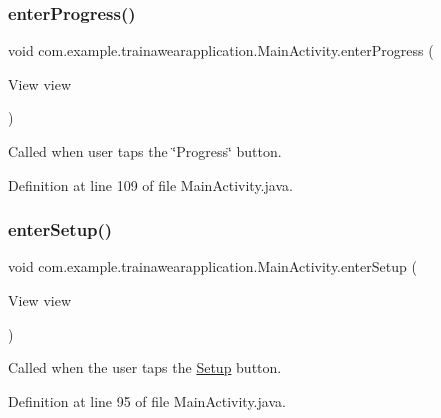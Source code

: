 \subsubsection{\texorpdfstring{enterProgress()}{enterProgress()}}
{\footnotesize\ttfamily void com.\+example.\+trainawearapplication.\+Main\+Activity.\+enter\+Progress (\begin{DoxyParamCaption}\item[{View}]{view }\end{DoxyParamCaption})}



Called when user taps the \char`\"{}\+Progress\char`\"{} button. 



Definition at line 109 of file Main\+Activity.\+java.


\begin{DoxyCode}{0}

\end{DoxyCode}
\mbox{\label{classcom_1_1example_1_1trainawearapplication_1_1_main_activity_aeb1226f930e5d26a0aa04fc7614f3618}} 
\subsubsection{\texorpdfstring{enterSetup()}{enterSetup()}}
{\footnotesize\ttfamily void com.\+example.\+trainawearapplication.\+Main\+Activity.\+enter\+Setup (\begin{DoxyParamCaption}\item[{View}]{view }\end{DoxyParamCaption})}



Called when the user taps the \mbox{\hyperlink{classcom_1_1example_1_1trainawearapplication_1_1_setup}{Setup}} button. 



Definition at line 95 of file Main\+Activity.\+java.


